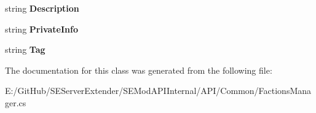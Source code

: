 \begin{DoxyCompactItemize}
\item 
\hypertarget{class_s_e_mod_a_p_i_internal_1_1_a_p_i_1_1_common_1_1_faction_affefc730ea1795fe0cc9e4fe58409dd2}{}string {\bfseries Description}\label{class_s_e_mod_a_p_i_internal_1_1_a_p_i_1_1_common_1_1_faction_affefc730ea1795fe0cc9e4fe58409dd2}

\item 
\hypertarget{class_s_e_mod_a_p_i_internal_1_1_a_p_i_1_1_common_1_1_faction_a141e9a5ba1eeda6e2ad5c7b2797207b5}{}string {\bfseries Private\+Info}\label{class_s_e_mod_a_p_i_internal_1_1_a_p_i_1_1_common_1_1_faction_a141e9a5ba1eeda6e2ad5c7b2797207b5}

\item 
\hypertarget{class_s_e_mod_a_p_i_internal_1_1_a_p_i_1_1_common_1_1_faction_afaff5fe7db82e7de518eec16e2ac16ec}{}string {\bfseries Tag}\label{class_s_e_mod_a_p_i_internal_1_1_a_p_i_1_1_common_1_1_faction_afaff5fe7db82e7de518eec16e2ac16ec}

\end{DoxyCompactItemize}


The documentation for this class was generated from the following file\+:\begin{DoxyCompactItemize}
\item 
E\+:/\+Git\+Hub/\+S\+E\+Server\+Extender/\+S\+E\+Mod\+A\+P\+I\+Internal/\+A\+P\+I/\+Common/Factions\+Manager.\+cs\end{DoxyCompactItemize}
